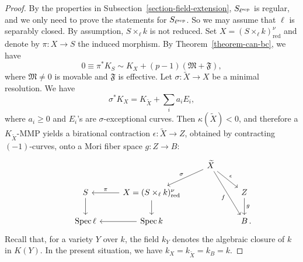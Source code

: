 \documentclass[reqno,oneside]{amsart}
\theoremstyle{definition}
\theoremstyle{plain}
\numberwithin{equation}{section}
\newcommand\Spec{\operatorname{Spec}}
\begin{document}
\begin{proof}
  By the properties in Subsection~\ref{section-field-extension}, $S_{\ell^{\rm sep}}$ is regular, and we only need to prove the statements for $S_{\ell^{\rm sep}}$.
  So we may assume that $\ell$ is separably closed.
  By assumption, $S \times_{\ell} k$ is not reduced.
  Set $X = (S \times_{\ell} k)_{\mathrm{red}}^\nu$ and denote by $\pi\colon X\to S$ the induced morphism.
  By Theorem~\ref{theorem-can-bc}, we have
  \begin{equation}\label{equation-cbf-1}
    0 \equiv \pi^*K_S \sim K_X + (p-1) (\mathfrak{M} + \mathfrak{F}),
  \end{equation}
  where $\mathfrak{M}\ne0$ is movable and $\mathfrak{F}$ is effective.
  Let $\sigma\colon \widetilde{X} \to X$ be a minimal resolution. We have
  \[
    \sigma^* K_X = K_{\widetilde{X}} + \sum_i a_i E_i
  , 
  \]
  where $a_i\ge0$ and $E_i$'s are $\sigma$-exceptional curves.
  Then $\kappa(\widetilde{X}) <0$, and therefore a $K_{\widetilde X}$-MMP yields a birational contraction $\epsilon\colon \widetilde X\to Z$, obtained by contracting $(-1)$-curves, onto a Mori fiber space $g\colon Z\to B$:
    \begin{equation}\label{equation-base-change-diagram}
      \begin{tikzcd}
        & & &\widetilde{X}\ar[ld, "\sigma"'] \ar[rd, "\epsilon"] \ar[rdd, "f"'] &\\
      &S \ar[d] & X = (S \times_{\ell} k)_{\rm red}^\nu \ar[l, "\pi"'] \ar[d] & &Z\ar[d, "g"]\\
      &\Spec \ell &\Spec k\ar[l] & &B \rlap{\,.}
    \end{tikzcd}
  \end{equation}  
  Recall that, for a variety $Y$ over $k$, the field $k_Y$ denotes the algebraic closure of $k$ in $K(Y)$.
  In the present situation, we have $k_X = k_{\widetilde{X}} = k_B = k$.


\end{proof}
\end{document}

